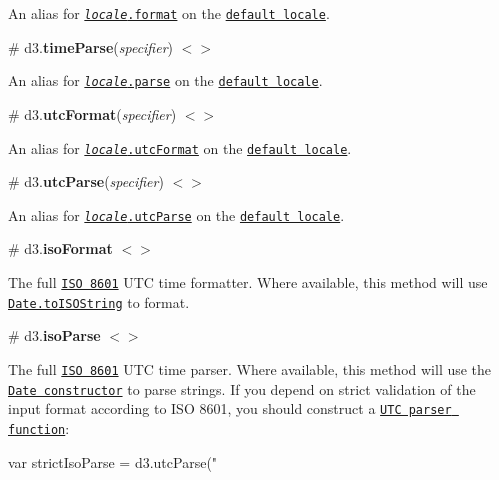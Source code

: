 An alias for \href{#locale_format}{\tt {\itshape locale}.format} on the \href{#timeFormatDefaultLocale}{\tt default locale}.

\label{_timeParse}%
\# d3.{\bfseries time\+Parse}({\itshape specifier}) \href{https://github.com/d3/d3-time-format/blob/master/src/defaultLocale.js#L5}{\tt $<$$>$}

An alias for \href{#locale_parse}{\tt {\itshape locale}.parse} on the \href{#timeFormatDefaultLocale}{\tt default locale}.

\label{_utcFormat}%
\# d3.{\bfseries utc\+Format}({\itshape specifier}) \href{https://github.com/d3/d3-time-format/blob/master/src/defaultLocale.js#L6}{\tt $<$$>$}

An alias for \href{#locale_utcFormat}{\tt {\itshape locale}.utc\+Format} on the \href{#timeFormatDefaultLocale}{\tt default locale}.

\label{_utcParse}%
\# d3.{\bfseries utc\+Parse}({\itshape specifier}) \href{https://github.com/d3/d3-time-format/blob/master/src/defaultLocale.js#L7}{\tt $<$$>$}

An alias for \href{#locale_utcParse}{\tt {\itshape locale}.utc\+Parse} on the \href{#timeFormatDefaultLocale}{\tt default locale}.

\label{_isoFormat}%
\# d3.{\bfseries iso\+Format} \href{https://github.com/d3/d3-time-format/blob/master/src/isoFormat.js}{\tt $<$$>$}

The full \href{https://en.wikipedia.org/wiki/ISO_8601}{\tt I\+SO 8601} U\+TC time formatter. Where available, this method will use \href{https://developer.mozilla.org/en-US/docs/JavaScript/Reference/Global_Objects/Date/toISOString}{\tt Date.\+to\+I\+S\+O\+String} to format.

\label{_isoParse}%
\# d3.{\bfseries iso\+Parse} \href{https://github.com/d3/d3-time-format/blob/master/src/isoParse.js}{\tt $<$$>$}

The full \href{https://en.wikipedia.org/wiki/ISO_8601}{\tt I\+SO 8601} U\+TC time parser. Where available, this method will use the \href{https://developer.mozilla.org/en-US/docs/JavaScript/Reference/Global_Objects/Date}{\tt Date constructor} to parse strings. If you depend on strict validation of the input format according to I\+SO 8601, you should construct a \href{#utcParse}{\tt U\+TC parser function}\+:


\begin{DoxyCode}
var strictIsoParse = d3.utcParse("%
\end{DoxyCode}


